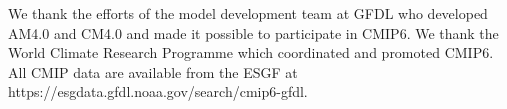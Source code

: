 \documentclass[draft]{agujournal2019}
\begin{document}
\acknowledgments
We thank the efforts of the model development team at GFDL who developed AM4.0 and CM4.0 and made it possible to participate in CMIP6.  We thank the World Climate Research Programme which coordinated and promoted CMIP6.  All CMIP data are available from the ESGF at https://esgdata.gfdl.noaa.gov/search/cmip6-gfdl.  

\end{document}

